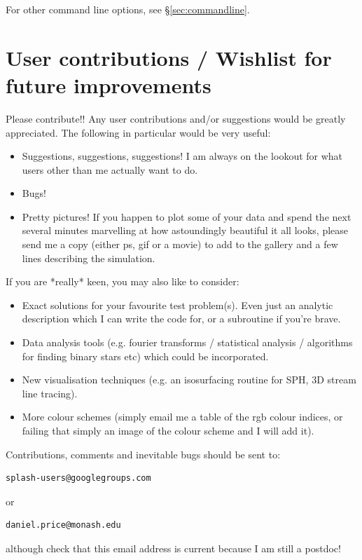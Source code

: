 \documentclass[a4paper,10pt]{article}
\begin{document}
  For other command line options, see \S\ref{sec:commandline}.

\section{User contributions / Wishlist for future improvements}%
 Please contribute!! Any user contributions and/or suggestions would be greatly
appreciated. The following in particular would be very useful:
\begin{itemize}
\item Suggestions, suggestions, suggestions! I am always on the lookout for what users other than me actually want to do.
\item Bugs!
\item Pretty pictures! If you happen to plot some of your data and spend the
next several minutes marvelling at how astoundingly beautiful it all looks, please send
me a copy (either ps, gif or a movie) to add to the gallery and a few lines
describing the simulation.
\end{itemize}
If you are *really* keen, you may also like to consider:
\begin{itemize}
\item Exact solutions for your favourite test problem(s). Even just an analytic description which I can write the code for, or a subroutine if you're brave.
\item Data analysis tools (e.g. fourier transforms / statistical analysis /
algorithms for finding binary stars etc) which could be incorporated.
\item New visualisation techniques (e.g. an isosurfacing routine for SPH, 3D stream line tracing).
\item More colour schemes (simply email me a table of the rgb colour indices, or failing that simply an image of the colour scheme and I will add it).
\end{itemize}
Contributions, comments and inevitable bugs should be sent to:
\begin{verbatim}
splash-users@googlegroups.com
\end{verbatim}
or
\begin{verbatim}
daniel.price@monash.edu
\end{verbatim}
although check that this email address is current because I am still a postdoc!
\end{document}
